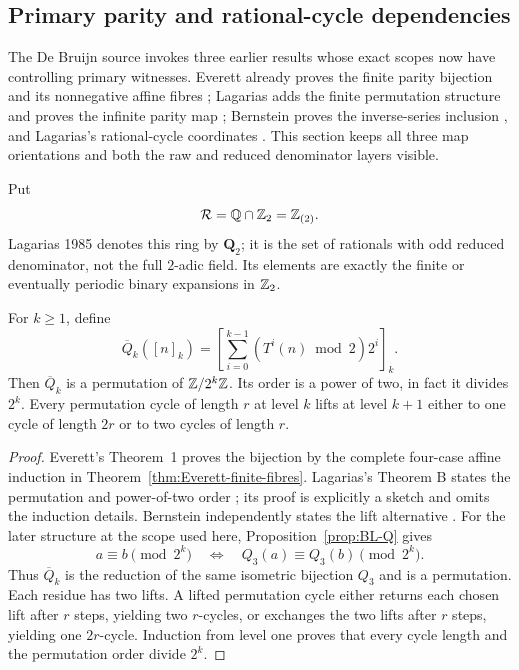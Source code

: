 \subsection{Primary parity and rational-cycle dependencies}
\label{subsec:primary-parity-dependencies}

The De Bruijn source invokes three earlier results whose exact scopes now
have controlling primary witnesses.  Everett already proves the finite
parity bijection and its nonnegative affine fibres \cite{Everett1977};
Lagarias adds the finite permutation structure and proves the infinite parity
map \cite{Lagarias1985}; Bernstein proves the inverse-series inclusion
\cite{Bernstein1994}, and Lagarias's rational-cycle coordinates
\cite{Lagarias1990}.  This section keeps all three map orientations and both
the raw and reduced denominator layers visible.

Put
\[
 \mathcal R=\mathbb{Q}\cap\mathbb{Z}_{2}=\mathbb{Z}_{(2)}.
\]
Lagarias 1985 denotes this ring by $\mathbf Q_2$; it is the set of rationals
with odd reduced denominator, not the full $2$-adic field.  Its elements are
exactly the finite or eventually periodic binary expansions in $\mathbb{Z}_{2}$.

\begin{proposition}
\label{prop:Lagarias-finite-parity}
For $k\geq1$, define
\[
 \overline Q_k([n]_k)
 =\left[\sum_{i=0}^{k-1}(T^i(n)\bmod2)2^i\right]_k.
\]
Then $\overline Q_k$ is a permutation of $\mathbb{Z}/2^k\mathbb{Z}$.  Its order is a power
of two, in fact it divides $2^k$.  Every permutation cycle of length $r$ at
level $k$ lifts at level $k+1$ either to one cycle of length $2r$ or to two
cycles of length $r$.
\end{proposition}

\begin{proof}
Everett's Theorem~1 proves the bijection by the complete four-case affine
induction in Theorem~\ref{thm:Everett-finite-fibres}.  Lagarias's Theorem B
states the permutation and power-of-two order
\cite[p.~7, Thm.~B]{Lagarias1985}; its proof is explicitly a sketch and omits
the induction details.  Bernstein independently states the lift alternative
\cite[p.~407]{Bernstein1994}.  For the later structure at the scope used here,
Proposition~\ref{prop:BL-Q} gives
\[
 a\equiv b\pmod{2^k}
 \quad\Longleftrightarrow\quad
 Q_3(a)\equiv Q_3(b)\pmod{2^k}.
\]
Thus $\overline Q_k$ is the reduction of the same isometric bijection $Q_3$
and is a permutation.  Each residue has two lifts.  A lifted permutation
cycle either returns each chosen lift after $r$ steps, yielding two
$r$-cycles, or exchanges the two lifts after $r$ steps, yielding one
$2r$-cycle.  Induction from level one proves that every cycle length and the
permutation order divide $2^k$.
\end{proof}

